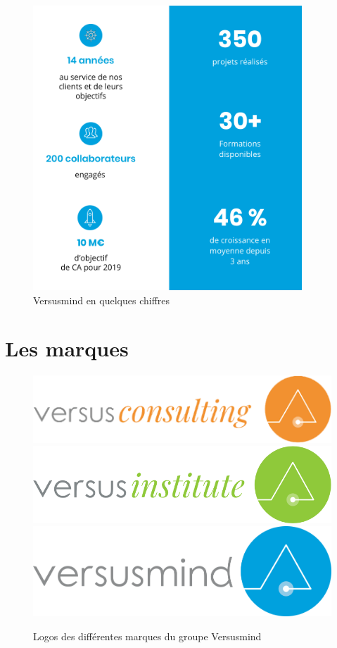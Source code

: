 \documentclass[12pt, a4paper]{report}
\begin{document}
\begin{figure}[H]
    \begin{center}
        \includegraphics[width=0.9\textwidth]{croissance.png}
    \end{center}
    \caption{Versusmind en quelques chiffres}
\end{figure}

\section{Les marques}
\begin{figure}[H]
    \centering
    \includegraphics[width=.45\textwidth]{versusconsulting.png}
    \includegraphics[width=.45\textwidth]{versusinstitute.png}
    \includegraphics[width=.45\textwidth]{versusmind.png}
    \caption{Logos des différentes marques du groupe Versusmind}
\end{figure}
\end{document}
